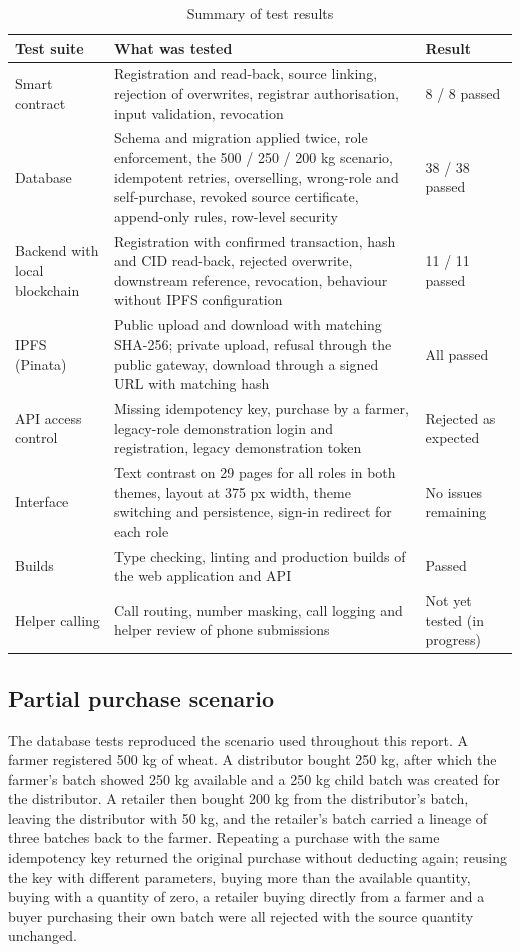 \begin{table}[!ht]
	\caption{Summary of test results}
	\label{tab:results}
	\centering
	\small
	\begin{tabular}{|L{4.2cm}|L{8.1cm}|L{2.2cm}|}
		\hline
		\textbf{Test suite} & \textbf{What was tested} & \textbf{Result} \\ \hline
		Smart contract & Registration and read-back, source linking, rejection of overwrites, registrar authorisation, input validation, revocation & 8 / 8 passed \\ \hline
		Database & Schema and migration applied twice, role enforcement, the 500 / 250 / 200 kg scenario, idempotent retries, overselling, wrong-role and self-purchase, revoked source certificate, append-only rules, row-level security & 38 / 38 passed \\ \hline
		Backend with local blockchain & Registration with confirmed transaction, hash and CID read-back, rejected overwrite, downstream reference, revocation, behaviour without IPFS configuration & 11 / 11 passed \\ \hline
		IPFS (Pinata) & Public upload and download with matching SHA-256; private upload, refusal through the public gateway, download through a signed URL with matching hash & All passed \\ \hline
		API access control & Missing idempotency key, purchase by a farmer, legacy-role demonstration login and registration, legacy demonstration token & Rejected as expected \\ \hline
		Interface & Text contrast on 29 pages for all roles in both themes, layout at 375 px width, theme switching and persistence, sign-in redirect for each role & No issues remaining \\ \hline
		Builds & Type checking, linting and production builds of the web application and API & Passed \\ \hline
		Helper calling & Call routing, number masking, call logging and helper review of phone submissions & Not yet tested (in progress) \\ \hline
	\end{tabular}
\end{table}

\subsection*{Partial purchase scenario}
The database tests reproduced the scenario used throughout this report. A farmer registered 500 kg of wheat. A distributor bought 250 kg, after which the farmer's batch showed 250 kg available and a 250 kg child batch was created for the distributor. A retailer then bought 200 kg from the distributor's batch, leaving the distributor with 50 kg, and the retailer's batch carried a lineage of three batches back to the farmer. Repeating a purchase with the same idempotency key returned the original purchase without deducting again; reusing the key with different parameters, buying more than the available quantity, buying with a quantity of zero, a retailer buying directly from a farmer and a buyer purchasing their own batch were all rejected with the source quantity unchanged.

